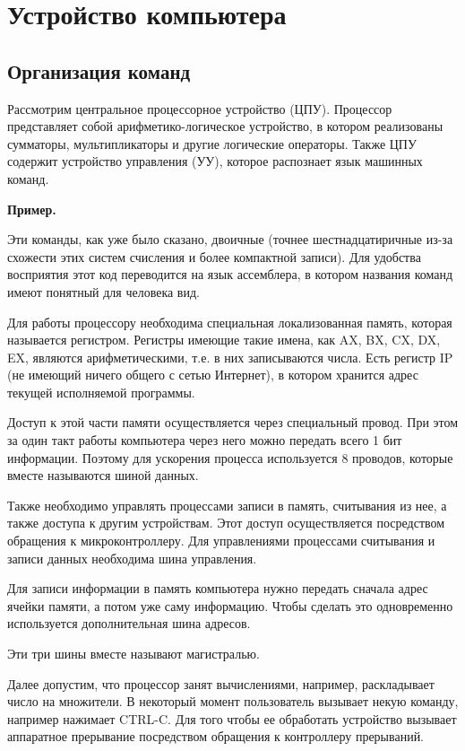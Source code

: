 \documentclass[a4paper, fleqn]{article}
\newenvironment{example}[1][]{\medskip \noindent \textbf{Пример. #1}\par \nopagebreak}{\medskip \par} %
\begin{document}
		\section*{Устройство компьютера}
		
		\subsection*{Организация команд}
		
			Рассмотрим центральное процессорное устройство (ЦПУ). Процессор представляет собой арифметико-логическое устройство, в котором реализованы сумматоры, мультипликаторы и другие логические операторы. Также ЦПУ содержит устройство управления (УУ), которое распознает язык машинных команд.
			
			\begin{example}
				Эти команды, как уже было сказано, двоичные (точнее шестнадцатиричные из-за схожести этих систем счисления и более компактной записи).
				Для удобства восприятия этот код переводится на язык ассемблера, в котором названия команд имеют понятный для человека вид.
			\end{example}
			
			Для работы процессору необходима специальная локализованная память, которая называется регистром. Регистры имеющие такие имена, как AX, BX, CX, DX, EX, являются арифметическими, т.е. в них записываются числа. Есть регистр IP (не имеющий ничего общего с сетью Интернет), в котором хранится адрес текущей исполняемой программы. 
			
			Доступ к этой части памяти осуществляется через специальный провод. При этом за один такт работы компьютера через него можно передать всего 1 бит информации. Поэтому для ускорения процесса используется 8 проводов, которые вместе называются шиной данных.
			
			Также необходимо управлять процессами записи в память, считывания из нее, а также доступа к другим устройствам. Этот доступ осуществляется посредством обращения к микроконтроллеру. Для управлениями процессами считывания и записи данных необходима шина управления. 
			
			Для записи информации в память компьютера нужно передать сначала адрес ячейки памяти, а потом уже саму информацию. Чтобы сделать это одновременно используется дополнительная шина адресов. 
			
			Эти три шины вместе называют магистралью. 
			
			Далее допустим, что процессор занят вычислениями, например, раскладывает число на множители. В некоторый момент пользователь вызывает некую команду, например нажимает CTRL-C. Для того чтобы ее обработать устройство вызывает аппаратное прерывание посредством обращения к контроллеру прерываний. 
			
\end{document}
